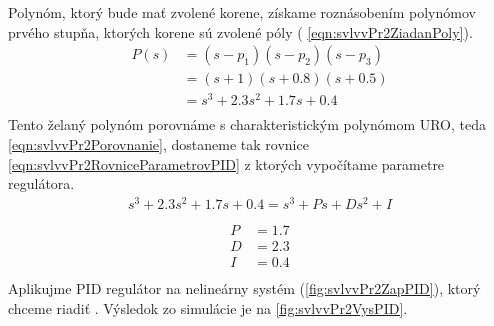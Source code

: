 \documentclass[../main.tex]{subfiles}
\begin{document}
	Polynóm, ktorý bude mať zvolené korene, získame roznásobením polynómov prvého stupňa, ktorých korene sú zvolené póly ( \cref{eqn:svlvvPr2ZiadanPoly}). 
	\begin{equation}
		\begin{aligned}
		P(s) &= (s - p_1)(s - p_2)(s - p_3) \\
		&= (s + 1)(s + 0.8)(s + 0.5) \\
		&= s^3 + 2.3s^2 + 1.7s + 0.4\\
	\end{aligned}
	\label{eqn:svlvvPr2ZiadanPoly}
	\end{equation}
	Tento želaný polynóm porovnáme s charakteristickým polynómom URO, teda \cref{eqn:svlvvPr2Porovnanie}, dostaneme tak rovnice \cref{eqn:svlvvPr2RovniceParametrovPID} z ktorých vypočítame parametre regulátora.
	\begin{equation}
		\begin{aligned}
			s^3 + 2.3s^2 + 1.7s + 0.4= s^3 + Ps + Ds^2 + I\\
		\end{aligned}
		\label{eqn:svlvvPr2Porovnanie}
	\end{equation}
	\begin{equation}
		\begin{aligned}
		\begin{matrix}
			P &= 1.7 \\
			D &= 2.3 \\ 
			I &= 0.4 \\
		\end{matrix}
		\label{eqn:svlvvPr2RovniceParametrovPID}
		\end{aligned}
	\end{equation}
	Aplikujme PID regulátor na nelineárny systém (\cref{fig:svlvvPr2ZapPID}), ktorý chceme riadiť . Výsledok zo simulácie je na \cref{fig:svlvvPr2VysPID}.	
	
\end{document}
